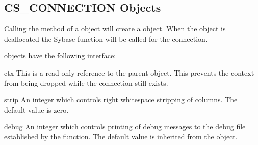 \subsection{CS_CONNECTION Objects}

Calling the  method of a 
object will create a  object.  When the
 object is deallocated the Sybase
 function will be called for the connection.

 objects have the following interface:

\begin{memberdesc}[CS_CONNECTION]{ctx}
This is a read only reference to the parent  object.
This prevents the context from being dropped while the connection
still exists.
\end{memberdesc}

\begin{memberdesc}[CS_CONNECTION]{strip}
An integer which controls right whitespace stripping of 
columns.  The default value is zero.
\end{memberdesc}

\begin{memberdesc}[CS_CONNECTION]{debug}
An integer which controls printing of debug messages to the debug file
established by the  function.  The default value
is inherited from the  object.
\end{memberdesc}

